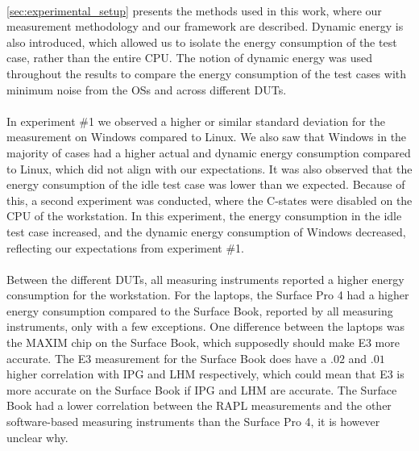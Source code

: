 
\paragraph*{}
\cref{sec:experimental_setup} presents the methods used in this work, where our measurement methodology and our framework are described. Dynamic energy is also introduced, which allowed us to isolate the energy consumption of the test case, rather than the entire CPU. The notion of dynamic energy was used throughout the results to compare the energy consumption of the test cases with minimum noise from the OSs and across different DUTs. 

\paragraph*{}
In experiment \#1 we observed a higher or similar standard deviation for the measurement on Windows compared to Linux. We also saw that Windows in the majority of cases had a higher actual and dynamic energy consumption compared to Linux, which did not align with our expectations. It was also observed that the energy consumption of the idle test case was lower than we expected. Because of this, a second experiment was conducted, where the C-states were disabled on the CPU of the workstation. In this experiment, the energy consumption in the idle test case increased, and the dynamic energy consumption of Windows decreased, reflecting our expectations from experiment \#1.

\paragraph*{}
Between the different DUTs, all measuring instruments reported a higher energy consumption for the workstation. For the laptops, the Surface Pro 4 had a higher energy consumption compared to the Surface Book, reported by all measuring instruments, only with a few exceptions. One difference between the laptops was the MAXIM chip on the Surface Book, which supposedly should make E3 more accurate. The E3 measurement for the Surface Book does have a $.02$ and $.01$ higher correlation with IPG and LHM respectively, which could mean that E3 is more accurate on the Surface Book if IPG and LHM are accurate. The Surface Book had a lower correlation between the RAPL measurements and the other software-based measuring instruments than the Surface Pro 4, it is however unclear why.

